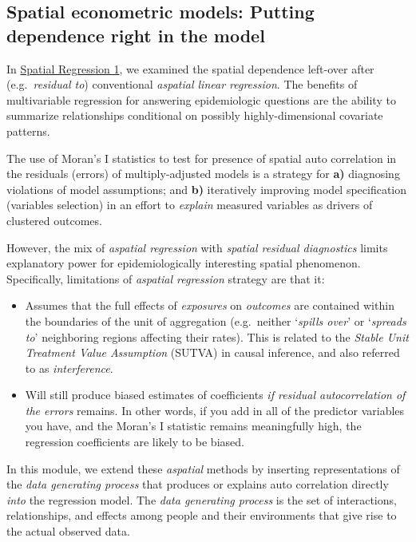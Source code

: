 \documentclass[
]{book}
\providecommand{\tightlist}{%
  \setlength{\itemsep}{0pt}\setlength{\parskip}{0pt}}
\begin{document}
\hypertarget{spatial-econometric-models-putting-dependence-right-in-the-model}{%
\subsection{Spatial econometric models: Putting dependence right in the model}\label{spatial-econometric-models-putting-dependence-right-in-the-model}}

In \protect\hyperlink{spatreg1}{Spatial Regression 1}, we examined the spatial dependence left-over after (e.g.~\emph{residual to}) conventional \emph{aspatial linear regression}. The benefits of multivariable regression for answering epidemiologic questions are the ability to summarize relationships conditional on possibly highly-dimensional covariate patterns.

The use of Moran's I statistics to test for presence of spatial auto correlation in the residuals (errors) of multiply-adjusted models is a strategy for \textbf{a)} diagnosing violations of model assumptions; and \textbf{b)} iteratively improving model specification (variables selection) in an effort to \emph{explain} measured variables as drivers of clustered outcomes.

However, the mix of \emph{aspatial regression} with \emph{spatial residual diagnostics} limits explanatory power for epidemiologically interesting spatial phenomenon. Specifically, limitations of \emph{aspatial regression} strategy are that it:

\begin{itemize}
\tightlist
\item
  Assumes that the full effects of \emph{exposures} on \emph{outcomes} are contained within the boundaries of the unit of aggregation (e.g.~neither `\emph{spills over}' or `\emph{spreads to}' neighboring regions affecting their rates). This is related to the \emph{Stable Unit Treatment Value Assumption} (SUTVA) in causal inference, and also referred to as \emph{interference}.
\item
  Will still produce biased estimates of coefficients \emph{if residual autocorrelation of the errors} remains. In other words, if you add in all of the predictor variables you have, and the Moran's I statistic remains meaningfully high, the regression coefficients are likely to be biased.
\end{itemize}

In this module, we extend these \emph{aspatial} methods by inserting representations of the \emph{data generating process} that produces or explains auto correlation directly \emph{into} the regression model. The \emph{data generating process} is the set of interactions, relationships, and effects among people and their environments that give rise to the actual observed data.
\end{document}
